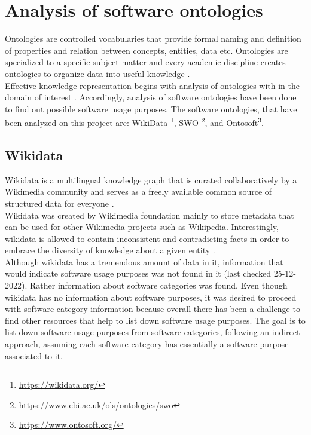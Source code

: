 \section{Analysis of software ontologies }
\label{sec:purpose:ontologies}

Ontologies are controlled vocabularies that provide formal naming and definition of properties and relation between concepts, entities, data etc.  Ontologies  are specialized  to a specific subject matter and every academic discipline creates ontologies to organize data into useful knowledge \citep{enwiki:1060388948}. \\

Effective knowledge representation begins with analysis of ontologies with in the domain of interest \citep{chandrasekaran1999ontologies}. Accordingly, analysis of software ontologies have been done to find out possible software usage purposes. The software ontologies, that have been analyzed on this project are: WikiData \footnote{\url{https://wikidata.org/}}, \ac{SWO} \footnote{\url{https://www.ebi.ac.uk/ols/ontologies/swo}}, and Ontosoft\footnote{\url{https://www.ontosoft.org/}}. 

 
\subsection{Wikidata}
\label{subsec:purpose:ontologies:Wikidata}

Wikidata is a multilingual knowledge graph that is curated collaboratively by a Wikimedia community and serves as a freely available common source of structured data for everyone \citep{enwiki:1060114687, enwiki:1060408581}. \\

Wikidata was created by Wikimedia foundation mainly to store metadata that can be used for other Wikimedia projects such as Wikipedia. Interestingly, wikidata is allowed to contain inconsistent and contradicting facts in order to embrace the diversity of knowledge about a given entity \citep{vrandevcic2012wikidata}. \\

Although wikidata has a tremendous amount of data in it, information that would indicate software usage purposes was not found in it (last checked 25-12-2022). Rather information about software categories was found. Even though wikidata has no information about software purposes, it was desired to proceed with software category information because overall there has been a challenge to find other resources that help to list down software usage purposes. The goal is to list down software usage purposes from software categories, following an indirect approach, assuming each software category has essentially a software purpose associated to it. \\

